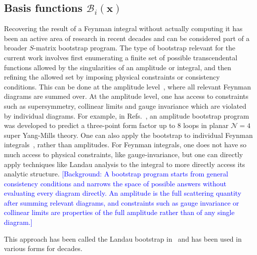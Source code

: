 \documentclass[a4paper,11pt]{article}
\begin{document}
\subsection{Basis functions $\mathcal{B}_i(\mathbf{x})$\label{sec:basis_set}}
Recovering the result of a Feynman integral without actually computing it has been an active area of research in recent decades and can be considered part of a broader $S$-matrix bootstrap program. The type of bootstrap relevant for the current work involves first enumerating a finite set of possible transcendental functions allowed by the singularities of an amplitude or integral,
and then refining the allowed set by imposing physical constraints or consistency conditions. This can be done at the amplitude level~\cite{Dixon:2016nkn,Caron-Huot:2016owq,Caron-Huot:2019vjl,Dixon:2020bbt,Dixon:2022rse,Basso:2024hlx,Cai:2024znx,Cai:2025atc,Guo:2021bym}, where all relevant Feynman diagrams are summed over. At the amplitude level, one has access to constraints such as supersymmetry, collinear limits and gauge invariance which are violated by individual diagrams. For example, in Refs.~\cite{Dixon:2020bbt, Dixon:2022rse}, an amplitude bootstrap program was developed to predict a three-point form factor up to 8 loops in planar $\mathcal{N}=4$ super Yang-Mills theory. One can also apply the bootstrap to individual Feynman integrals~\cite{Chicherin:2017dob,Caron-Huot:2018dsv,Henn:2018cdp,He:2021fwf,He:2021eec,Morales:2022csr}, rather than amplitudes. For Feynman integrals, one does not have so much access to physical constraints, like gauge-invariance, but one can directly apply techniques like Landau analysis to the integral to more directly access its analytic structure.
\textcolor{blue}{\small [Background: A bootstrap program starts from general consistency conditions and narrows the space of possible answers without evaluating every diagram directly. An amplitude is the full scattering quantity after summing relevant diagrams, and constraints such as gauge invariance or collinear limits are properties of the full amplitude rather than of any single diagram.]}

This approach has been called the Landau bootstrap in~\cite{Hannesdottir:2024hke} and has been used in various forms for decades.
\end{document}
